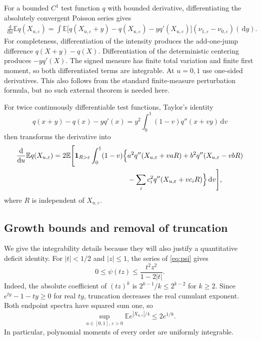 \documentclass[11pt]{article}
\numberwithin{equation}{section}
\theoremstyle{definition}
\theoremstyle{remark}
\newcommand{\E}{\mathbb E}
\newcommand{\ind}{\mathbf 1}
\newcommand{\dd}{\,\mathrm d}
\begin{document}
For a bounded $C^1$ test function $q$ with bounded derivative, differentiating the absolutely convergent Poisson series gives
\begin{align}\label{eq:poisson-derivative}
\frac{\mathrm d}{\mathrm du}\E q(X_{u,\varepsilon})
=\int \E\bigl[q(X_{u,\varepsilon}+y)-q(X_{u,\varepsilon})
-yq'(X_{u,\varepsilon})\bigr]
(\nu_{1,\varepsilon}-\nu_{0,\varepsilon})(\dd y).
\end{align}
For completeness, differentiation of the intensity produces the add-one-jump difference $q(X+y)-q(X)$. Differentiation of the deterministic centering produces $-yq'(X)$. The signed measure has finite total variation and finite first moment, so both differentiated terms are integrable. At $u=0,1$ use one-sided derivatives. This also follows from the standard finite-measure perturbation formula, but no such external theorem is needed here.

For twice continuously differentiable test functions, Taylor's identity
\begin{equation}\label{eq:Taylor}
q(x+y)-q(x)-yq'(x)
=y^2\int_0^1(1-v)q''(x+vy)\dd v
\end{equation}
then transforms the derivative into
\begin{align}\label{eq:derivative-chord}
\frac{\mathrm d}{\mathrm du}\E q(X_{u,\varepsilon})
=2\E\Biggl[\ind_{R>\varepsilon}\int_0^1(1-v)
\Bigl\{&a^2q''(X_{u,\varepsilon}+vaR)
+b^2q''(X_{u,\varepsilon}-vbR)\notag\\
&-\sum_i c_i^2q''(X_{u,\varepsilon}+vc_iR)\Bigr\}\dd v\Biggr],
\end{align}
where $R$ is independent of $X_{u,\varepsilon}$.

\subsection{Growth bounds and removal of truncation}
We give the integrability details because they will also justify a quantitative deficit identity. For $|t|<1/2$ and $|z|\leq1$, the series of \eqref{eq:psi} gives
\begin{equation}\label{eq:psi-bound}
0\leq\psi(tz)
\leq\frac{t^2z^2}{1-2|t|}.
\end{equation}
Indeed, the absolute coefficient of $(tz)^k$ is $2^{k-1}/k\leq2^{k-2}$ for $k\geq2$. Since $e^{ty}-1-ty\geq0$ for real $ty$, truncation decreases the real cumulant exponent. Both endpoint spectra have squared sum one, so
\begin{equation}\label{eq:uniform-exp}
\sup_{u\in[0,1],\,\varepsilon>0}
\E e^{|X_{u,\varepsilon}|/4}\leq2e^{1/8}.
\end{equation}
In particular, polynomial moments of every order are uniformly integrable.
\end{document}
